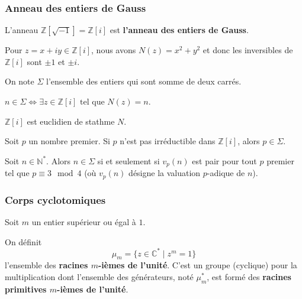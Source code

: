 	\subsubsection{Anneau des entiers de Gauss}

	\begin{definition}
		L'anneau $\mathbb{Z}[\sqrt{-1}] = \mathbb{Z}[i]$ est \textbf{l'anneau des entiers de Gauss}.
	\end{definition}

	\begin{example}
		Pour $z = x+iy \in \mathbb{Z}[i]$, nous avons $N(z) = x^2+y^2$ et donc les inversibles de $\mathbb{Z}[i]$ sont $\pm 1$ et $\pm i$.
	\end{example}


	\begin{notation}
		On note $\Sigma$ l'ensemble des entiers qui sont somme de deux carrés.
	\end{notation}

	\begin{remark}
		$n \in \Sigma \iff \exists z \in \mathbb{Z}[i] \text{ tel que } N(z)=n$.
	\end{remark}

	\begin{lemma}
		$\mathbb{Z}[i]$ est euclidien de stathme $N$.
	\end{lemma}

	\begin{lemma}
		Soit $p$ un nombre premier. Si $p$ n'est pas irréductible dans $\mathbb{Z}[i]$, alors $p \in \Sigma$.
	\end{lemma}


	\begin{theorem}
		Soit $n \in \mathbb{N}^*$. Alors $n \in \Sigma$ si et seulement si $v_p(n)$ est pair pour tout $p$ premier tel que $p \equiv 3 \mod 4$ (où $v_p(n)$ désigne la valuation $p$-adique de $n$).
	\end{theorem}

	\subsubsection{Corps cyclotomiques}

	Soit $m$ un entier supérieur ou égal à $1$.


	\begin{definition}
		On définit
		\[ \mu_m = \{ z \in \mathbb{C}^* \mid z^m = 1 \} \]
		l'ensemble des \textbf{racines $m$-ièmes de l'unité}. C'est un groupe (cyclique) pour la multiplication dont l'ensemble des générateurs, noté $\mu_m^*$, est formé des \textbf{racines primitives $m$-ièmes de l'unité}.
	\end{definition}

